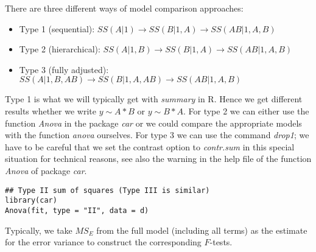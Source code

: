 There are three different ways of model comparison approaches:
\begin{itemize}
	\item Type 1 (sequential): $SS(A | 1) \to SS(B | 1, A) \to SS(AB | 1, A, B)$
	\item Type 2 (hierarchical): $SS(A | 1, B) \to SS(B | 1, A) \to SS(AB | 1, A, B)$
	\item Type 3 (fully adjusted): $SS(A | 1, B, AB) \to SS(B | 1, A, AB) \to SS(AB | 1, A, B)$
\end{itemize}

Type 1 is what we will typically get with \textit{summary} in R. Hence we get different results whether we write $y \sim A * B$ or $y \sim B * A$. For type 2 we can either use the function \textit{Anova} in the package \textit{car} or we could compare the appropriate models with the function \textit{anova} ourselves. For type 3 we can use the command \textit{drop1}; we have to be careful that we set the contrast option to \textit{contr.sum} in this special situation for technical reasons, see also the warning in the help file of the function \textit{Anova} of package \textit{car}.

\begin{lstlisting}
## Type II sum of squares (Type III is similar)
library(car)
Anova(fit, type = "II", data = d)	
\end{lstlisting}

Typically, we take $MS_E$ from the full model (including all terms) as the estimate for the error variance to construct the corresponding $F$-tests.
